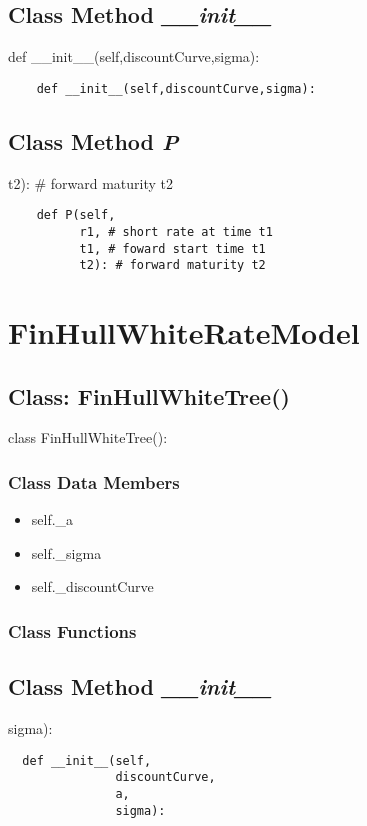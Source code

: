 \documentclass[twoside,11pt]{book}
\begin{document}
\subsection{Class Method {\it \_\_init\_\_}}
def \_\_init\_\_(self,discountCurve,sigma):

\begin{lstlisting}
    def __init__(self,discountCurve,sigma):
\end{lstlisting}

\subsection{Class Method {\it P}}
t2): \# forward maturity t2

\begin{lstlisting}
    def P(self,
          r1, # short rate at time t1
          t1, # foward start time t1
          t2): # forward maturity t2
\end{lstlisting}

\newpage
\section{FinHullWhiteRateModel}

\subsection{Class: FinHullWhiteTree()}
class FinHullWhiteTree():

\subsubsection{Class Data Members}
\begin{itemize}
\item{self.\_a}
\item{self.\_sigma}
\item{self.\_discountCurve}
\end{itemize}

\subsubsection{Class Functions}

\subsection{Class Method {\it \_\_init\_\_}}
sigma):

\begin{lstlisting}
  def __init__(self,
               discountCurve,
               a,
               sigma):
\end{lstlisting}
\end{document}
